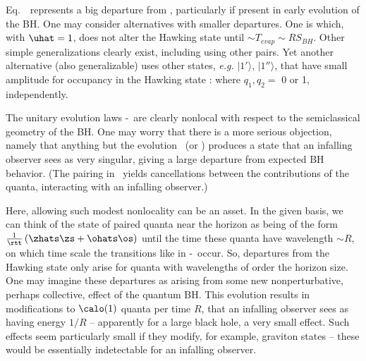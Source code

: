 Eq.~\evolone\ represents a big departure from \paircreate, particularly if present in early evolution of the BH.  One may consider alternatives with smaller departures.  One is
%
\eqn{} 
%
which, with $\uhat=1$, does not alter the Hawking state until $\sim T_{evap}\sim R S_{BH}$.   Other simple generalizations clearly exist, including using other pairs. Yet another alternative (also generalizable) uses other states, {\it e.g.} $|1'\rangle$, $|1''\rangle$, that have small amplitude for occupancy in the Hawking state \hawkstate:
%
\eqn{}
%
where $q_1,q_2=$ 0 or 1, independently.

The unitary evolution laws \evolone-\evolthree\ are clearly nonlocal with respect to the semiclassical geometry of the BH.  One may worry that there is a more serious objection, namely that anything but the evolution \paircreate\ (or \hawkstate) produces a state that an infalling observer sees as very singular, giving a large departure from expected BH behavior.  (The pairing in \hawkstate\ yields cancellations  between the contributions of the quanta, interacting with an infalling observer.)

Here, allowing such modest nonlocality can be an asset.  In the given basis, we can think of the state of paired quanta near the horizon as being of the form $ {1\over \rtt}\left(\zhats \zs+ \ohats\os\right)$ until the time these quanta have wavelength $\sim R$, on which time scale the transitions like  in \evolone-\evolthree\ occur.  So, departures from the Hawking state only arise for quanta with wavelengths of order the horizon size.  One may imagine these departures as arising from some new nonperturbative, perhaps collective, effect of the quantum BH.
This evolution results in modifications to $\calo(1)$ quanta per time $R$,  that an infalling observer sees as having energy $1/R$ -- apparently for a large black hole, a very small effect.  Such effects seem particularly small if they modify, for example, graviton states --  these would be essentially indetectable for an infalling observer.

